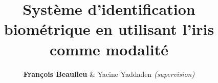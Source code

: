\title{Système d'identification biométrique en utilisant l'iris comme modalité}

\author{
\textbf{François Beaulieu}
\& 
Yacine Yaddaden \textit{(supervision)} %
}

